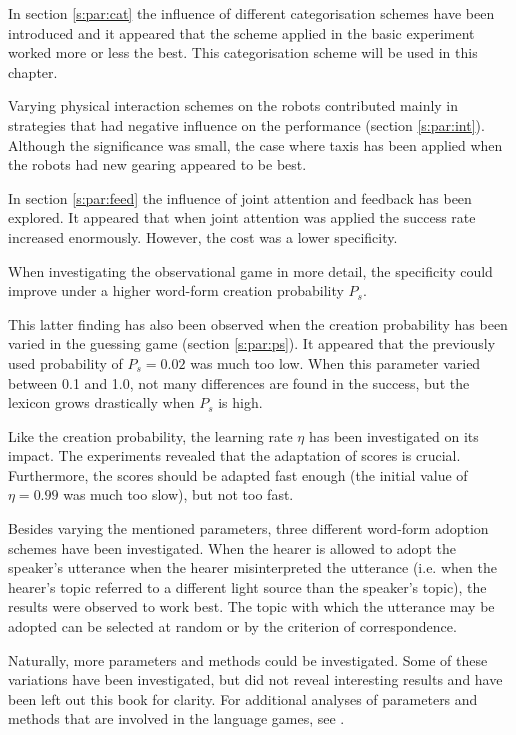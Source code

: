In section \ref{s:par:cat} the influence of different categorisation schemes have been introduced and it appeared that the scheme applied in the basic experiment worked more or less the best. This categorisation scheme will be used in this chapter. 

Varying physical interaction schemes on the robots contributed mainly in strategies that had negative influence on the performance (section \ref{s:par:int}). Although the significance was small, the case where taxis has been applied when the robots had new gearing appeared to be best.

In section \ref{s:par:feed} the influence of joint attention and feedback has been explored. It appeared that when joint attention was applied the success rate increased enormously. However, the cost was a lower specificity.

When investigating the observational game in more detail, the specificity could improve under a higher word-form creation probability $P_s$. 

This latter finding has also been observed when the creation probability has been varied in the guessing game (section \ref{s:par:ps}). It appeared that the previously used probability of $P_s=0.02$ was much too low. When this parameter varied between 0.1 and 1.0, not many differences are found in the success, but the lexicon grows drastically when $P_s$ is high.

Like the creation probability, the learning rate $\eta$ has been investigated on its impact. The experiments revealed that the adaptation of scores is crucial. Furthermore, the scores should be adapted fast enough (the initial value of $\eta=0.99$ was much too slow), but not too fast.

Besides varying the mentioned parameters, three different word-form adoption schemes have been investigated. When the hearer is allowed to adopt the speaker's utterance when the hearer misinterpreted the utterance (i.e. when the hearer's topic referred to a different light source than the speaker's topic), the results were observed to work best. The topic with which the utterance may be adopted can be selected at random or by the criterion of correspondence. 


Naturally, more parameters and methods could be investigated. Some of these variations have been investigated, but did not reveal interesting results and have been left out this book for clarity. For additional analyses of parameters and methods that are involved in the language games, see \cite{dejong:2000,kaplan:2000}.

